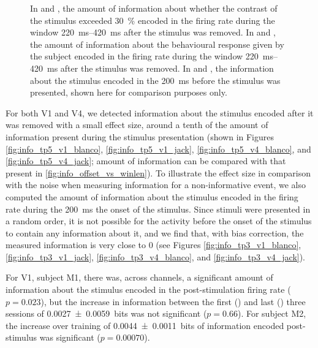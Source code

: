 \begin{figure}[htbp]
    \hspace*{\fill}
    \caption{
In \protect{} and \protect{}, the amount of information about whether the contrast of the stimulus exceeded \SI{30}{\percent} encoded in the firing rate during the window \SIrange{220}{420}{\milli\second} after the stimulus was removed.
In \protect{} and \protect{}, the amount of information about the behavioural response given by the subject encoded in the firing rate during the window \SIrange{220}{420}{\milli\second} after the stimulus was removed.
In \protect{} and \protect{}, the information about the stimulus encoded in the \SI{200}{\milli\second} before the stimulus was presented, shown here for comparison purposes only.
    \label{fig:info_tp5_v4}
}
\end{figure}


For both \ac{V1} and \ac{V4}, we detected information about the stimulus encoded after it was removed with a small effect size, around a tenth of the amount of information present during the stimulus presentation (shown in Figures \ref{fig:info_tp5_v1_blanco}, \ref{fig:info_tp5_v1_jack}, \ref{fig:info_tp5_v4_blanco}, and \ref{fig:info_tp5_v4_jack}; amount of information can be compared with that present in \autoref{fig:info_offset_vs_winlen}).
To illustrate the effect size in comparison with the noise when measuring information for a non-informative event, we also computed the amount of information about the stimulus encoded in the firing rate during the \SI{200}{\milli\second}  the onset of the stimulus.
Since stimuli were presented in a random order, it is not possible for the activity before the onset of the stimulus to contain any information about it, and we find that, with bias correction, the measured information is very close to \num{0} (see Figures \ref{fig:info_tp3_v1_blanco}, \ref{fig:info_tp3_v1_jack}, \ref{fig:info_tp3_v4_blanco}, and \ref{fig:info_tp3_v4_jack}).

For \ac{V1}, subject \ac{M1}, there was, across channels, a significant amount of information about the stimulus encoded in the post-stimulation firing rate ($p=0.023$), but the increase in information between the first () and last () three sessions of \SI{0.0027\pm0.0059}{bits} was not significant ($p=0.66$).
For subject \ac{M2}, the increase over training of \SI{0.0044\pm0.0011}{bits} of information encoded post-stimulus was significant ($p=0.00070$).

